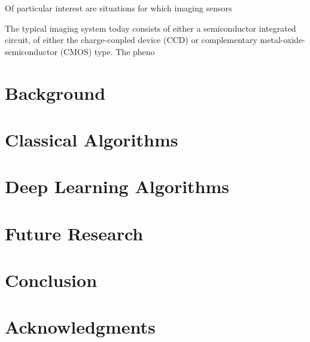 \documentclass[journal]{IEEEtran}
\begin{document}
    Of particular interest are situations for which imaging sensors

    The typical imaging system today consists of either a semiconductor integrated circuit, of either the
    charge-coupled device (CCD) or complementary metal-oxide-semiconductor (CMOS) type. The pheno




    \section{Background}\label{sec:background}
    \section{Classical Algorithms}\label{sec:classical-algorithms}
    \section{Deep Learning Algorithms}\label{sec:deep-learning-algorithms}
    \section{Future Research}\label{sec:future-research}
    \section{Conclusion}\label{sec:conclusion}

    \section*{Acknowledgments}
    \newpage
    \printbibliography
\end{document}

